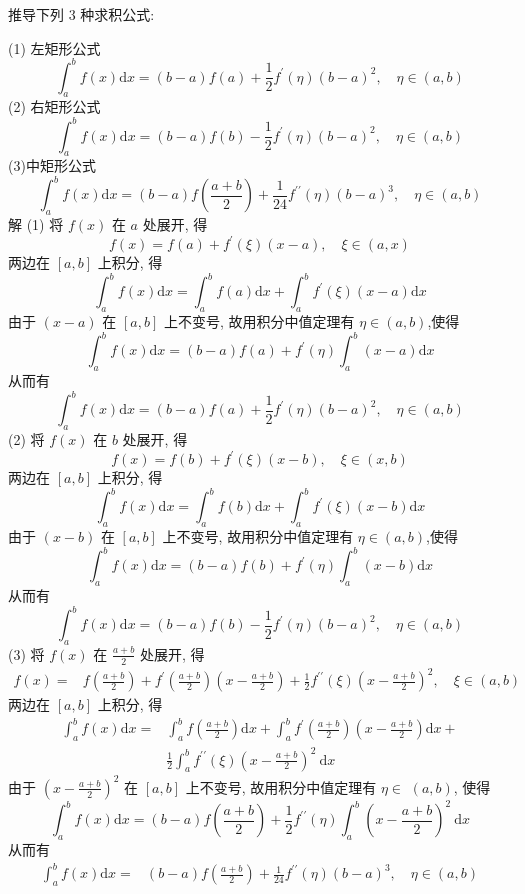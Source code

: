  \begin{tcolorbox}[enhanced,colback=10,colframe=9,breakable,coltitle=green!25!black,title=2024]
 推导下列 3 种求积公式:
 
(1) 左矩形公式
$$
\int_{a}^{b} f(x) \mathrm{d} x=  (b-a) f(a)+  \frac{1}{2} f^{\prime}(\eta)(b-a)^{2}, \quad \eta \in(a, b)
$$
(2) 右矩形公式
$$
\int_{a}^{b} f(x) \mathrm{d} x=  (b-a) f(b)-  \frac{1}{2} f^{\prime}(\eta)(b-a)^{2}, \quad \eta \in(a, b)
$$
(3)中矩形公式
$$
\int_{a}^{b} f(x) \mathrm{d} x=(b-a) f\left(\frac{a+b}{2}\right)+\frac{1}{24} f^{\prime \prime}(\eta)(b-a)^{3}, \quad \eta \in(a, b)
$$
\tcblower
解 (1) 将 $ f(x) $ 在 $ a $ 处展开, 得
$$
f(x)=f(a)+f^{\prime}(\xi)(x-a), \quad \xi \in(a, x)
$$
两边在 $ [a, b] $ 上积分, 得
$$
\int_{a}^{b} f(x) \mathrm{d} x=\int_{a}^{b} f(a) \mathrm{d} x+\int_{a}^{b} f^{\prime}(\xi)(x-a) \mathrm{d} x
$$
由于 $ (x-a) $ 在 $ [a, b] $ 上不变号, 故用积分中值定理有 $ \eta \in(a, b) $,使得
$$
\int_{a}^{b} f(x) \mathrm{d} x=(b-a) f(a)+f^{\prime}(\eta) \int_{a}^{b}(x-a) \mathrm{d} x
$$
从而有
$$
\int_{a}^{b} f(x) \mathrm{d} x=(b-a) f(a)+\frac{1}{2} f^{\prime}(\eta)(b-a)^{2}, \quad \eta \in(a, b)
$$
(2) 将 $ f(x) $ 在 $ b $ 处展开, 得
$$
f(x)=f(b)+f^{\prime}(\xi)(x-b), \quad \xi \in(x, b)
$$
两边在 $ [a, b] $ 上积分, 得
$$
\int_{a}^{b} f(x) \mathrm{d} x=\int_{a}^{b} f(b) \mathrm{d} x+\int_{a}^{b} f^{\prime}(\xi)(x-b) \mathrm{d} x
$$
由于 $ (x-b) $ 在 $ [a, b] $ 上不变号, 故用积分中值定理有 $ \eta \in(a, b) $,使得
$$
\int_{a}^{b} f(x) \mathrm{d} x=(b-a) f(b)+f^{\prime}(\eta) \int_{a}^{b}(x-b) \mathrm{d} x
$$
从而有
$$
\int_{a}^{b} f(x) \mathrm{d} x=(b-a) f(b)-\frac{1}{2} f^{\prime}(\eta)(b-a)^{2}, \quad \eta \in(a, b)
$$
(3) 将 $ f(x) $ 在 $ \frac{a+b}{2} $ 处展开, 得
$$
\begin{aligned}
f(x)= & f\left(\frac{a+b}{2}\right)+f^{\prime}\left(\frac{a+b}{2}\right)\left(x-\frac{a+b}{2}\right)+  \frac{1}{2} f^{\prime \prime}(\xi)\left(x-\frac{a+b}{2}\right)^{2}, \quad \xi \in(a, b)
\end{aligned}
$$
两边在 $ [a, b] $ 上积分, 得
$$
\begin{aligned}
\int_{a}^{b} f(x) \mathrm{d} x= & \int_{a}^{b} f\left(\frac{a+b}{2}\right) \mathrm{d} x+\int_{a}^{b} f^{\prime}\left(\frac{a+b}{2}\right)\left(x-\frac{a+b}{2}\right) \mathrm{d} x+ \\
& \frac{1}{2} \int_{a}^{b} f^{\prime \prime}(\xi)\left(x-\frac{a+b}{2}\right)^{2} \mathrm{~d} x
\end{aligned}
$$
由于 $ \left(x-\frac{a+b}{2}\right)^{2} $ 在 $ [a, b] $ 上不变号, 故用积分中值定理有 $ \eta \in $ $ (a, b) $, 使得
$$
\int_{a}^{b} f(x) \mathrm{d} x=(b-a) f\left(\frac{a+b}{2}\right)+\frac{1}{2} f^{\prime \prime}(\eta) \int_{a}^{b}\left(x-\frac{a+b}{2}\right)^{2} \mathrm{~d} x
$$
从而有
$$
\begin{aligned}
\int_{a}^{b} f(x) \mathrm{d} x= & (b-a) f\left(\frac{a+b}{2}\right)+ \frac{1}{24} f^{\prime \prime}(\eta)(b-a)^{3}, \quad \eta \in(a, b)
\end{aligned}
$$
\end{tcolorbox}

